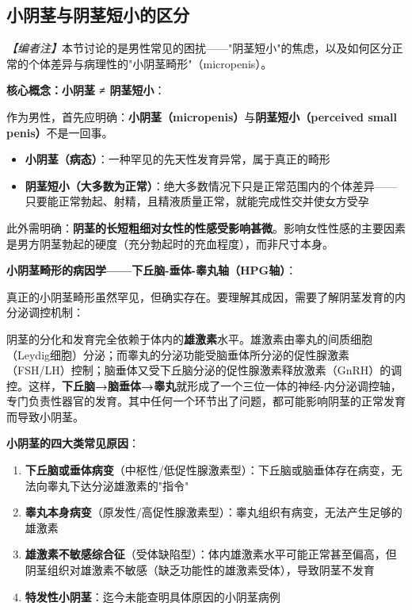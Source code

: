 \documentclass[12pt,a4paper,twoside]{ctexbook}
\begin{document}
\subsection{小阴茎与阴茎短小的区分}

\noindent\textit{【编者注】}本节讨论的是男性常见的困扰——"阴茎短小"的焦虑，以及如何区分正常的个体差异与病理性的"小阴茎畸形"（micropenis）。

\vspace{0.5em}
\noindent\textbf{核心概念：小阴茎 ≠ 阴茎短小}：

作为男性，首先应明确：\textbf{小阴茎（micropenis）}与\textbf{阴茎短小（perceived small penis）}不是一回事。

\begin{itemize}
	\item \textbf{小阴茎（病态）}：一种罕见的先天性发育异常，属于真正的畸形
	\item \textbf{阴茎短小（大多数为正常）}：绝大多数情况下只是正常范围内的个体差异——只要能正常勃起、射精，且精液质量正常，就能完成性交并使女方受孕
\end{itemize}

此外需明确：\textbf{阴茎的长短粗细对女性的性感受影响甚微}。影响女性性感的主要因素是男方阴茎勃起的硬度（充分勃起时的充血程度），而非尺寸本身。

\vspace{0.5em}
\noindent\textbf{小阴茎畸形的病因学——下丘脑-垂体-睾丸轴（HPG轴）}：

真正的小阴茎畸形虽然罕见，但确实存在。要理解其成因，需要了解阴茎发育的内分泌调控机制：

阴茎的分化和发育完全依赖于体内的\textbf{雄激素}水平。雄激素由睾丸的间质细胞（Leydig细胞）分泌；而睾丸的分泌功能受脑垂体所分泌的促性腺激素（FSH/LH）控制；脑垂体又受下丘脑分泌的促性腺激素释放激素（GnRH）的调控。这样，\textbf{下丘脑→脑垂体→睾丸}就形成了一个三位一体的神经-内分泌调控轴，专门负责性器官的发育。其中任何一个环节出了问题，都可能影响阴茎的正常发育而导致小阴茎。

\vspace{0.5em}
\noindent\textbf{小阴茎的四大类常见原因}：

\begin{enumerate}
	\item \textbf{下丘脑或垂体病变}（中枢性/低促性腺激素型）：下丘脑或脑垂体存在病变，无法向睾丸下达分泌雄激素的"指令"
	\item \textbf{睾丸本身病变}（原发性/高促性腺激素型）：睾丸组织有病变，无法产生足够的雄激素
	\item \textbf{雄激素不敏感综合征}（受体缺陷型）：体内雄激素水平可能正常甚至偏高，但阴茎组织对雄激素不敏感（缺乏功能性的雄激素受体），导致阴茎不发育
	\item \textbf{特发性小阴茎}：迄今未能查明具体原因的小阴茎病例
\end{enumerate}
\end{document}
